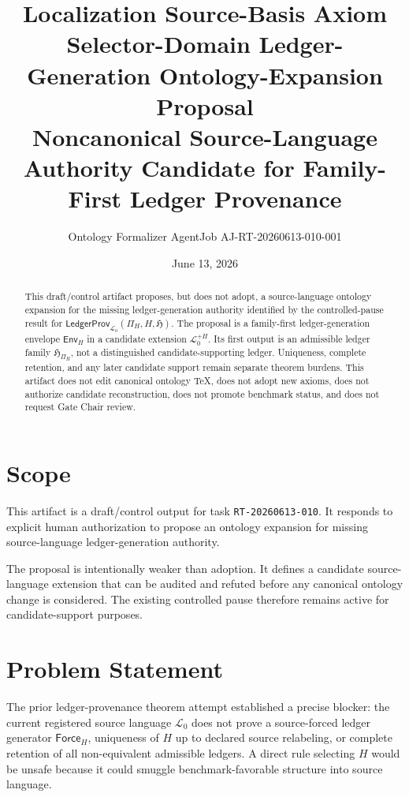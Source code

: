 \documentclass[11pt]{article}
\title{\textbf{Localization Source-Basis Axiom Selector-Domain Ledger-Generation Ontology-Expansion Proposal}\\[0.35em]
\large Noncanonical Source-Language Authority Candidate for Family-First Ledger Provenance}
\author{Ontology Formalizer AgentJob AJ-RT-20260613-010-001}
\date{June 13, 2026}
\newcommand{\Lang}{\mathcal{L}_{0}}
\newcommand{\LangPlus}{\mathcal{L}_{0}^{+H}}
\newcommand{\LedgerFam}{\mathfrak{H}}
\newcommand{\PiH}{\Pi_H}
\newcommand{\EnvH}{\mathsf{Env}_{H}}
\begin{document}
\maketitle

\begin{abstract}
This draft/control artifact proposes, but does not adopt, a source-language
ontology expansion for the missing ledger-generation authority identified by
the controlled-pause result for
\(\mathsf{LedgerProv}_{\Lang}(\Pi_H,H,\LedgerFam)\). The proposal is a
family-first ledger-generation envelope \(\EnvH\) in a candidate extension
\(\LangPlus\). Its first output is an admissible ledger family
\(\LedgerFam_{\PiH}\), not a distinguished candidate-supporting ledger.
Uniqueness, complete retention, and any later candidate support remain
separate theorem burdens. This artifact does not edit canonical ontology
TeX, does not adopt new axioms, does not authorize candidate reconstruction,
does not promote benchmark status, and does not request Gate Chair review.
\end{abstract}

\section{Scope}

This artifact is a draft/control output for task \texttt{RT-20260613-010}.
It responds to explicit human authorization to propose an ontology expansion
for missing source-language ledger-generation authority.

The proposal is intentionally weaker than adoption. It defines a candidate
source-language extension that can be audited and refuted before any
canonical ontology change is considered. The existing controlled pause
therefore remains active for candidate-support purposes.

\section{Problem Statement}

The prior ledger-provenance theorem attempt established a precise blocker:
the current registered source language \(\Lang\) does not prove a
source-forced ledger generator \(\mathsf{Force}_H\), uniqueness of \(H\) up
to declared source relabeling, or complete retention of all non-equivalent
admissible ledgers. A direct rule selecting \(H\) would be unsafe because it
could smuggle benchmark-favorable structure into source language.
\end{document}
